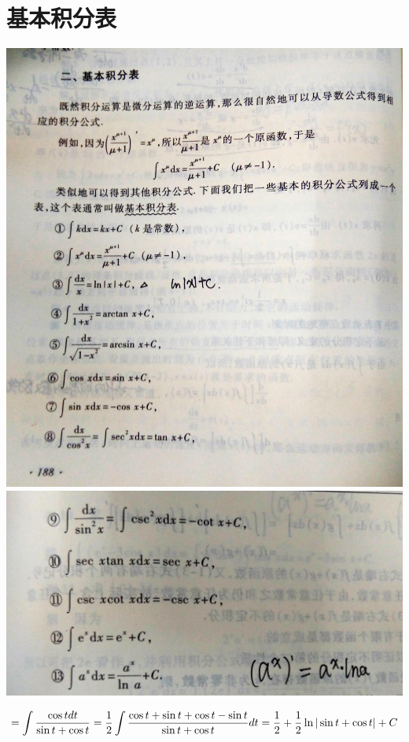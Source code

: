 \documentclass[UTF8]{ctexart}
\begin{document}
\section{基本积分表}
\includegraphics[width=14cm]{9345E7/9476215E0863B8FB681EC9D2BB921BDB.jpg}
\includegraphics[width=14cm]{9345E7/4FEE9C843E57935F87D1E16F255FA43E.jpg}

$$=\int \frac{\cos t dt}{\sin t + \cos t} \\
=\frac{1}{2} \int \frac{\cos t + \sin t +\cos t - \sin t}{\sin t + \cos t}dt \\
= \frac{1}{2} + \frac{1}{2} \ln | \sin t + \cos t| +C $$
\end{document}
